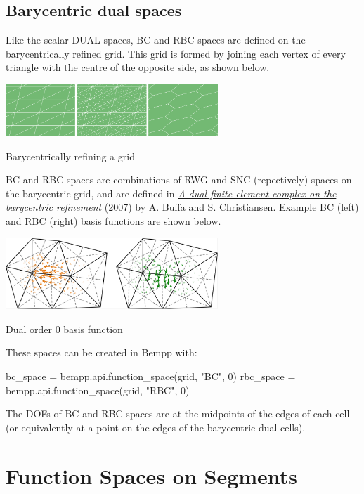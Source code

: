 \documentclass[a4paper]{book}
\begin{document}
\subsection{ Barycentric dual spaces}Like the scalar DUAL spaces, BC and RBC spaces are defined on the barycentrically refined grid.
This grid is formed by joining
each vertex of every triangle with the centre of the opposite side, as shown below.
\begin{center}
\includegraphics[width=0.6\textwidth]{../img/barycentric_mesh.png}

\footnotesize{Barycentrically refining a grid}\end{center}

BC and RBC spaces are combinations of RWG and SNC (repectively) spaces on the barycentric grid,
and are defined in
\href{https://www.jstor.org/stable/40234460?seq=1}{\emph{A dual finite element complex on the barycentric refinement} (2007) by A. Buffa and S. Christiansen}.
Example BC (left) and RBC (right) basis functions are shown below.

\begin{center}
\includegraphics[width=0.6\textwidth]{../img/bc_and_rbc.png}

\footnotesize{Dual order 0 basis function}\end{center}

These spaces can be created in Bempp with:

\begin{python}
bc_space = bempp.api.function_space(grid, "BC", 0)
rbc_space = bempp.api.function_space(grid, "RBC", 0)
\end{python}

The DOFs of BC and RBC spaces are at the midpoints of the edges of each cell (or equivalently at
a point on the edges of the barycentric dual cells).


\section{Function Spaces on Segments}
\end{document}
